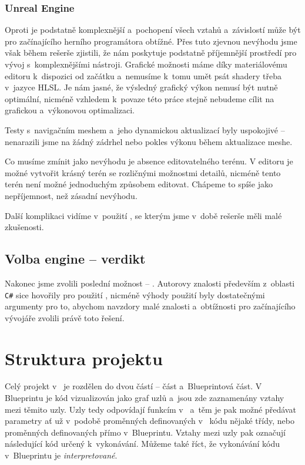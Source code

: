 \subsubsection{Unreal Engine}
Oproti \UN{} je \UE{} podstatně komplexnější a~pochopení všech vztahů a~závislostí může být pro začínajícího herního programátora obtížné. Přes tuto zjevnou nevýhodu jsme však během rešerše zjistili, že \UE{} nám poskytuje podstatně příjemnější prostředí pro vývoj s~komplexnějšími nástroji. Grafické možnosti máme díky materiálovému editoru k~dispozici od začátku a~nemusíme k~tomu umět psát shadery třeba v~jazyce HLSL. Je nám jasné, že výsledný grafický výkon nemusí být nutně optimální, nicméně vzhledem k~povaze této práce stejně nebudeme cílit na grafickou a~výkonovou optimalizaci.

Testy s~navigačním meshem a~jeho dynamickou aktualizací byly uspokojivé -- nenarazili jsme na žádný zádrhel nebo pokles výkonu během aktualizace meshe. 

Co musíme zmínit jako nevýhodu je absence editovatelného terénu. V editoru je možné vytvořit krásný terén se rozličnými možnostmi detailů, nicméně tento terén není možné jednoduchým způsobem editovat. Chápeme to spíše jako nepříjemnost, než zásadní nevýhodu. 

Další komplikaci vidíme v~použití \CPP{}, se kterým jsme v~době rešerše měli malé zkušenosti.




\subsection{Volba engine -- verdikt}


Nakonec jsme zvolili poslední možnost -- \UE{}. Autorovy znalosti především z~oblasti \texttt{C\#} sice hovořily pro použití \UN{}, nicméně výhody použití \UE{} byly dostatečnými argumenty pro to, abychom navzdory malé znalosti \CPP{} a~obtížnosti pro začínajícího vývojáře zvolili právě toto řešení.

\section{Struktura projektu}

Celý projekt v~\UE{} je rozdělen do dvou částí -- \CPP{} část a~Blueprintová část. V Blueprintu je kód vizualizován jako graf uzlů a~jsou zde zaznamenány vztahy mezi těmito uzly. Uzly tedy odpovídají funkcím v~\CPP{} a~těm je pak možné předávat parametry ať už v~podobě proměnných definovaných v~\CPP{} kódu nějaké třídy, nebo proměnných definovaných přímo v~Blueprintu. Vztahy mezi uzly pak označují následující kód určený k~vykonávání. Můžeme také říct, že vykonávání kódu v~Blueprintu je \textit{interpretované}.

